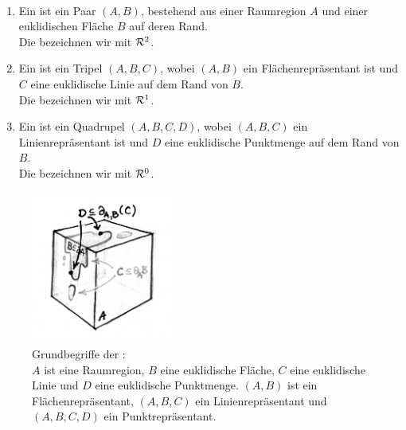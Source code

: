         \begin{dfn}[Repräsentanten]\ \vspace{0pt}
            \begin{enumerate}
                \item Ein  ist ein Paar $(A,B)$, 
                    bestehend aus einer Raumregion $A$ und einer euklidischen Fläche $B$ auf deren Rand.\\
                    Die  bezeichnen wir mit $\mathcal{R}^2$.
                \item Ein  ist ein Tripel $(A,B,C)$, 
                    wobei $(A,B)$ ein Flächenrepräsentant ist und $C$ eine euklidische Linie auf dem Rand von $B$.\\
                    Die  bezeichnen wir mit $\mathcal{R}^1$.
                \item Ein  ist ein Quadrupel $(A,B,C,D)$, 
                    wobei $(A,B,C)$ ein Linienrepräsentant ist und $D$ eine euklidische Punktmenge auf dem Rand von $B$.\\
                    Die  bezeichnen wir mit $\mathcal{R}^0$.
            \end{enumerate}
        \end{dfn}

        \begin{figure}[ht]
            \centering
            \includegraphics[height=5cm]{luise/repr.png}
            \caption[Grundbegriffe der $\mathcal{R}$-Struktur]{Grundbegriffe der \strukt:\\
                    $A$ ist eine Raumregion, $B$ eine euklidische Fläche, $C$ eine euklidische Linie und $D$ eine euklidische Punktmenge. $(A,B)$ ist ein Flächenrepräsentant, $(A,B,C)$ ein Linienrepräsentant und $(A,B,C,D)$ ein Punktrepräsentant.}
            \label{fig:repr}
        \end{figure}

